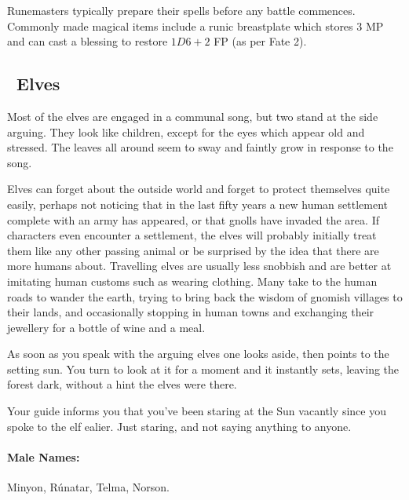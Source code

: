 \begin{multicols}{2}
\dwarvenrunemaster

Runemasters typically prepare their spells before any battle commences.
Commonly made magical items include a runic breastplate which stores 3 MP and can cast  a blessing to restore $1D6+2$ FP (as per Fate 2).

\subsection[Elves]{\El\ Elves}
\label{best_elves}

\begin{boxtext}

  Most of the elves are engaged in a communal song, but two stand at the side arguing.
  They look like children, except for the eyes which appear old and stressed.
  The leaves all around seem to sway and faintly grow in response to the song.

\end{boxtext}

Elves can forget about the outside world and forget to protect themselves quite easily, perhaps not noticing that in the last fifty years a new human settlement complete with an army has appeared, or that gnolls have invaded the area.
If characters even encounter a settlement, the elves will probably initially treat them like any other passing animal or be surprised by the idea that there are more humans about.
Travelling elves are usually less snobbish and are better at imitating human customs such as wearing clothing.
Many take to the human roads to wander the earth, trying to bring back the wisdom of gnomish villages to their lands, and occasionally stopping in human towns and exchanging their jewellery for a bottle of wine and a meal.

\begin{boxtext}

  As soon as you speak with the arguing elves one looks aside, then points to the setting sun.
  You turn to look at it for a moment and it instantly sets, leaving the forest dark, without a hint the elves were there.

  Your guide informs you that you've been staring at the Sun vacantly since you spoke to the elf ealier.
  Just staring, and not saying anything to anyone.

\end{boxtext}

\paragraph{Male Names:} Minyon, R\'{u}natar, Telma, Norson.

\end{multicols}
